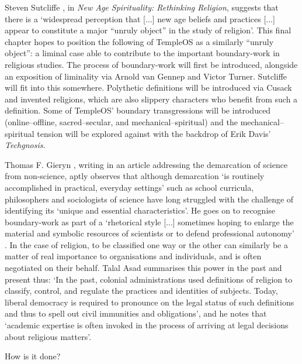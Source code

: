 \documentclass{article}
\begin{document}
Steven Sutcliffe \parencite*{Sutcliffe14},
in \textit{New Age Spirituality: Rethinking Religion},
suggests that there is a `widespread perception that [...]
new age beliefs and practices [...] appear to constitute
a major ``unruly object'' in the study of religion'.
This final chapter hopes to position the following of TempleOS as a
similarly ``unruly object'': a liminal case able to contribute to the
important boundary-work in religious studies.
The process of boundary-work will first be introduced,
alongside an exposition of liminality via Arnold van Gennep and Victor Turner.
Sutcliffe will fit into this somewhere.
Polythetic definitions will be introduced via Cusack and invented religions,
which are also slippery characters who benefit from such a definition.
Some of TempleOS' boundary transgressions will be introduced
(online--offline, sacred--secular, and mechanical--spiritual)
and the mechanical--spiritual tension will be explored
against with the backdrop of Erik Davis' \textit{Techgnosis}.

Thomas F. Gieryn \parencite*[781]{Gieryn83}, writing in an article
addressing the demarcation of science from non-science, aptly observes
that although demarcation `is routinely accomplished in practical,
everyday settings' such as school curricula,
philosophers and sociologists of science have long struggled
with the challenge of identifying its `unique and essential characteristics'.
He goes on to recognise boundary-work as part of a `rhetorical style [...]
sometimes hoping to enlarge the material and symbolic resources of scientists
or to defend professional autonomy' \parencite[782]{Gieryn83}.
In the case of religion, to be classified one way or the other can similarly
be a matter of real importance to organisations and individuals,
and is often negotiated on their behalf.
Talal Asad \parencite*[39]{Asad11} summarises this power
in the past and present thus:
`In the past, colonial  administrations  used definitions of religion
to classify, control, and regulate the practices and identities of subjects.
Today, liberal democracy  is required to pronounce on the legal status
of such definitions and thus to spell out civil immunities and obligations',
and he notes that `academic expertise is often invoked
in the process of arriving at legal decisions about religious matters'.

How is it done?



\printbibliography
\end{document}
